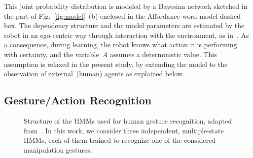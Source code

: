 This joint probability distribution is modeled by a Bayesian network sketched in the part of Fig.~\ref{fig:model}~(b) enclosed in the Affordance-word model dashed box.
The dependency structure and the model parameters are estimated by the robot in an ego-centric way through interaction with the environment, as in~\cite{salvi:2012:smcb}.
As a consequence, during learning, the robot knows what action it is performing with certainty, and the variable~$A$ assumes a deterministic value. This assumption is relaxed in the present study, by extending the model to the observation of external~(human) agents as explained below.

\subsection{Gesture/Action Recognition}

\newcommand{\myscalefactor}{0.8}

\newcommand{\standardhmm}[1]{
    \node[draw,circle] (hmm#1s1) {$s_1$};
    \node[draw,circle, right of=hmm#1s1] (hmm#1s2) {$s_2$};
    \node[circle, right of=hmm#1s2] (hmm#1s3) {\dots};
    \node[draw,circle, right of=hmm#1s3] (hmm#1s4) {$s_Q$};
    \node[left of=hmm#1s1]  (invisible1) {};
    \node[right of=hmm#1s4] (invisible2) {};
    \path[->] (hmm#1s1) edge (hmm#1s2);
    \path[loop above] (hmm#1s1) edge (hmm#1s1);
    \path[->] (hmm#1s2) edge (hmm#1s3);
    \path[loop above] (hmm#1s2) edge (hmm#1s2);
    \path[dashed] (hmm#1s2) -- (hmm#1s3);
    \path[->] (hmm#1s3) edge (hmm#1s4);
    \path[loop above] (hmm#1s4) edge (hmm#1s4);
    \path[->] (invisible1) edge (hmm#1s1);
    \path[->] (hmm#1s4) edge (invisible2);
}

\newcommand{\modeltwo}{
}

\begin{figure}
  \centering
  \modeltwo
  \caption{Structure of the \acp{HMM} used for human gesture recognition, adapted from~\cite{saponaro:2013:crhri}. In this work, we consider three independent, multiple-state \acp{HMM}, each of them trained to recognize one of the considered manipulation gestures.}
  \label{fig:hmms}
\end{figure}

